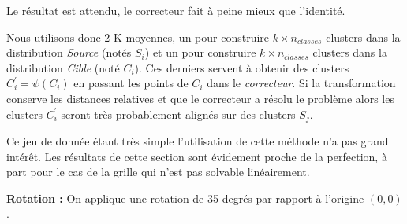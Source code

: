 Le résultat est attendu, le correcteur fait à peine mieux que l'identité.

Nous utilisons donc 2 K-moyennes, un pour construire $k\times n_{classes}$ clusters 
dans la distribution \emph{Source} (notés $S_i$) et un pour construire $k\times n_{classes}$ 
clusters dans la distribution \emph{Cible} (noté $C_i$). Ces derniers servent à obtenir 
des clusters $C_i^\prime = \psi(C_i)$ en passant les points de $C_i$ dans le \emph{correcteur}.
Si la transformation conserve les distances relatives et que le correcteur a résolu le problème
alors les clusters $C_i^\prime$ seront très probablement alignés sur des clusters $S_j$.


Ce jeu de donnée étant très simple l'utilisation de cette méthode n'a pas grand intérêt. 
Les résultats de cette section sont évidement proche de la perfection,
à part pour le cas de la grille qui n'est pas solvable linéairement.

{\Large \textbf{Rotation :}} On applique une rotation de 35 degrés par rapport à l'origine $(0,0)$.


